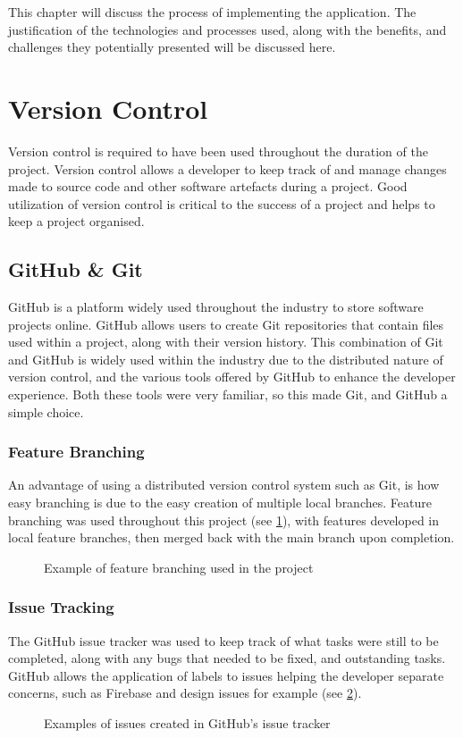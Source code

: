 This chapter will discuss the process of implementing the application. The justification of the technologies and processes used, along with the benefits, and challenges they potentially presented will be discussed here.

\section{Version Control}
Version control is required to have been used throughout the duration of the project. Version control allows a developer to keep track of and manage changes made to source code and other software artefacts during a project. Good utilization of version control is critical to the success of a project and helps to keep a project organised.
\subsection{GitHub \& Git}
GitHub \cite{github} is a platform widely used throughout the industry to store software projects online. GitHub allows users to create Git repositories \cite{git} that contain files used within a project, along with their version history. This combination of Git and GitHub is widely used within the industry due to the distributed nature of version control, and the various tools offered by GitHub to enhance the developer experience. Both these tools were very familiar, so this made Git, and GitHub a simple choice. 
\subsubsection{Feature Branching}
An advantage of using a distributed version control system such as Git, is how easy branching is due to the easy creation of multiple local branches. Feature branching was used throughout this project (see \ref{fig:branching}), with features developed in local feature branches, then merged back with the main branch upon completion.  
\begin{figure}[!htbp]
    \centering
    \begin{subfigure}[b]{0.90\textwidth}
    \end{subfigure}
    \caption{Example of feature branching used in the project}
    \label{fig:branching}
\end{figure}
\subsubsection{Issue Tracking}
The GitHub issue tracker was used to keep track of what tasks were still to be completed, along with any bugs that needed to be fixed, and outstanding tasks. GitHub allows the application of labels to issues helping the developer separate concerns, such as Firebase and design issues for example (see \ref{fig:issues}).
\begin{figure}[!htbp]
    \centering
    \begin{subfigure}[b]{0.90\textwidth}
    \end{subfigure}
    \caption{Examples of issues created in GitHub's issue tracker}
    \label{fig:issues}
\end{figure}
